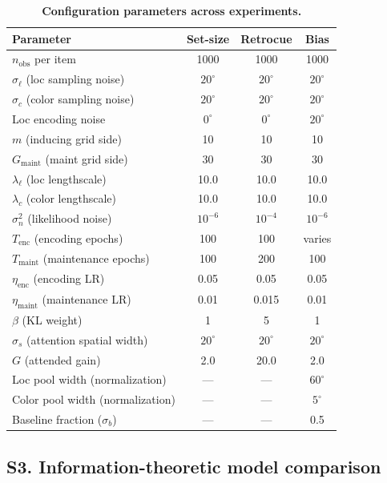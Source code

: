 \documentclass[11pt,letterpaper]{article}
\begin{document}
\begin{table}[H]
\centering
\caption{\textbf{Configuration parameters across experiments.}}
\label{tab:params}
\small
\begin{tabular}{lccc}
\toprule
\textbf{Parameter} & \textbf{Set-size} & \textbf{Retrocue} & \textbf{Bias} \\
\midrule
$n_{\mathrm{obs}}$ per item & 1000 & 1000 & 1000 \\
$\sigma_\ell$ (loc sampling noise) & $20^\circ$ & $20^\circ$ & $20^\circ$ \\
$\sigma_c$ (color sampling noise) & $20^\circ$ & $20^\circ$ & $20^\circ$ \\
Loc encoding noise & $0^\circ$ & $0^\circ$ & $20^\circ$ \\
$m$ (inducing grid side) & 10 & 10 & 10 \\
$G_{\mathrm{maint}}$ (maint grid side) & 30 & 30 & 30 \\
$\lambda_\ell$ (loc lengthscale) & 10.0 & 10.0 & 10.0 \\
$\lambda_c$ (color lengthscale) & 10.0 & 10.0 & 10.0 \\
$\sigma_n^2$ (likelihood noise) & $10^{-6}$ & $10^{-4}$ & $10^{-6}$ \\
$T_{\mathrm{enc}}$ (encoding epochs) & 100 & 100 & varies \\
$T_{\mathrm{maint}}$ (maintenance epochs) & 100 & 200 & 100 \\
$\eta_{\mathrm{enc}}$ (encoding LR) & 0.05 & 0.05 & 0.05 \\
$\eta_{\mathrm{maint}}$ (maintenance LR) & 0.01 & 0.015 & 0.01 \\
$\beta$ (KL weight) & 1 & 5 & 1 \\
$\sigma_s$ (attention spatial width) & $20^\circ$ & $20^\circ$ & $20^\circ$ \\
$G$ (attended gain) & 2.0 & 20.0 & 2.0 \\
Loc pool width (normalization) & --- & --- & $60^\circ$ \\
Color pool width (normalization) & --- & --- & $5^\circ$ \\
Baseline fraction ($\sigma_b$) & --- & --- & 0.5 \\
\bottomrule
\end{tabular}
\end{table}


\subsection*{S3. Information-theoretic model comparison}
\end{document}
